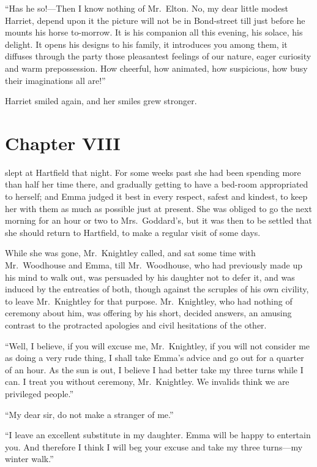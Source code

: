 ``Has he so!---Then I know nothing of Mr.\ Elton.  No, my dear
little modest Harriet, depend upon it the picture will not be
in Bond-street till just before he mounts his horse to-morrow.
It is his companion all this evening, his solace, his delight.
It opens his designs to his family, it introduces you among them,
it diffuses through the party those pleasantest feelings of our nature,
eager curiosity and warm prepossession.  How cheerful, how animated,
how suspicious, how busy their imaginations all are!''

Harriet smiled again, and her smiles grew stronger.



\chapter{Chapter VIII}


 slept at Hartfield that night.  For some weeks past she
had been spending more than half her time there, and gradually
getting to have a bed-room appropriated to herself; and Emma
judged it best in every respect, safest and kindest, to keep her
with them as much as possible just at present.  She was obliged
to go the next morning for an hour or two to Mrs.\ Goddard's,
but it was then to be settled that she should return to Hartfield,
to make a regular visit of some days.

While she was gone, Mr.\ Knightley called, and sat some time with
Mr.\ Woodhouse and Emma, till Mr.\ Woodhouse, who had previously made up
his mind to walk out, was persuaded by his daughter not to defer it,
and was induced by the entreaties of both, though against the scruples
of his own civility, to leave Mr.\ Knightley for that purpose.
Mr.\ Knightley, who had nothing of ceremony about him, was offering
by his short, decided answers, an amusing contrast to the protracted
apologies and civil hesitations of the other.

``Well, I believe, if you will excuse me, Mr.\ Knightley, if you
will not consider me as doing a very rude thing, I shall take
Emma's advice and go out for a quarter of an hour.  As the sun
is out, I believe I had better take my three turns while I can.
I treat you without ceremony, Mr.\ Knightley.  We invalids think we
are privileged people.''

``My dear sir, do not make a stranger of me.''

``I leave an excellent substitute in my daughter.  Emma will be happy
to entertain you.  And therefore I think I will beg your excuse
and take my three turns---my winter walk.''

